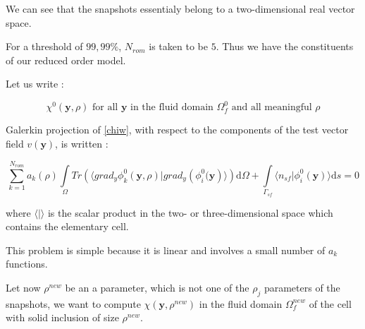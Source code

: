We can see that the snapshots essentialy belong to a two-dimensional real vector space.

\par
For a threshold of $99,99\%$, $N_{rom}$ is taken to be $5$. %
Thus we have the constituents of our reduced order model.

\ligneinter
Let us write :

\[\chi^0\left(\mathbf{y},\rho\right)\text{ for all $\mathbf{y}$ in the fluid domain $\Omega_f^0$ and all meaningful $\rho$}\]

\par
Galerkin projection of \ref{chiw}, with respect to the components of the test vector field $v(\mathbf{y})$, is written :

\begin{equation}\label{morchiz}
\sum\limits_{k=1}^{N_{rom}} a_k(\rho)\int\limits_{\Omega}Tr\left(\langle grad_y\phi_k^0 \left(\mathbf{y},\rho\right)|grad_y\left(\phi_i^0(\mathbf{y}\right)\rangle\right)\text{d}\Omega+%
\int\limits_{\Gamma_{sf}}\langle n_{sf}|\phi_i^0(\mathbf{y})\rangle \text{d}s %
=0
\end{equation}

where $\langle |\rangle$ is the scalar product in the two- or three-dimensional space which contains the elementary cell.

\par
This problem is simple because it is linear and involves a small number of $a_k$ functions.%


\etoile
Let now $\rho^{new}$ be an a parameter, which is not one of the $\rho_j$ parameters of the snapshots, %
we want to compute $\chi(\mathbf{y},\rho^{new})$ in the fluid domain $\Omega_f^{new}$ of the cell with solid inclusion of size $\rho^{new}$.


